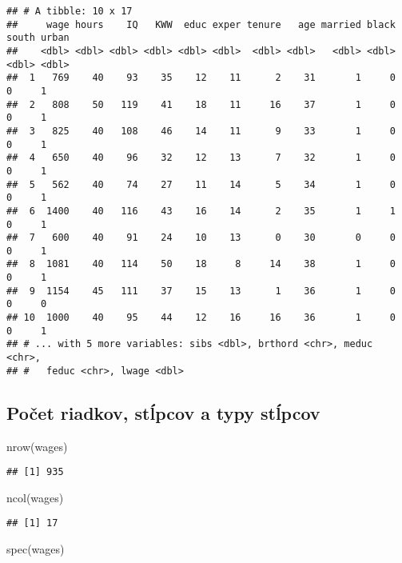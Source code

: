 \documentclass[
]{article}
\newenvironment{Shaded}{\begin{snugshade}}{\end{snugshade}}
\newcommand{\FunctionTok}[1]{\textcolor[rgb]{0.00,0.00,0.00}{#1}}
\newcommand{\NormalTok}[1]{#1}
\begin{document}
\begin{verbatim}
## # A tibble: 10 x 17
##     wage hours    IQ   KWW  educ exper tenure   age married black south urban
##    <dbl> <dbl> <dbl> <dbl> <dbl> <dbl>  <dbl> <dbl>   <dbl> <dbl> <dbl> <dbl>
##  1   769    40    93    35    12    11      2    31       1     0     0     1
##  2   808    50   119    41    18    11     16    37       1     0     0     1
##  3   825    40   108    46    14    11      9    33       1     0     0     1
##  4   650    40    96    32    12    13      7    32       1     0     0     1
##  5   562    40    74    27    11    14      5    34       1     0     0     1
##  6  1400    40   116    43    16    14      2    35       1     1     0     1
##  7   600    40    91    24    10    13      0    30       0     0     0     1
##  8  1081    40   114    50    18     8     14    38       1     0     0     1
##  9  1154    45   111    37    15    13      1    36       1     0     0     0
## 10  1000    40    95    44    12    16     16    36       1     0     0     1
## # ... with 5 more variables: sibs <dbl>, brthord <chr>, meduc <chr>,
## #   feduc <chr>, lwage <dbl>
\end{verbatim}

\hypertarget{poux10det-riadkov-stux13apcov-a-typy-stux13apcov}{%
\subsection{Počet riadkov, stĺpcov a typy
stĺpcov}\label{poux10det-riadkov-stux13apcov-a-typy-stux13apcov}}

\begin{Shaded}
\begin{Highlighting}[]
\FunctionTok{nrow}\NormalTok{(wages)}
\end{Highlighting}
\end{Shaded}

\begin{verbatim}
## [1] 935
\end{verbatim}

\begin{Shaded}
\begin{Highlighting}[]
\FunctionTok{ncol}\NormalTok{(wages)}
\end{Highlighting}
\end{Shaded}

\begin{verbatim}
## [1] 17
\end{verbatim}

\begin{Shaded}
\begin{Highlighting}[]
\FunctionTok{spec}\NormalTok{(wages)}
\end{Highlighting}
\end{Shaded}
\end{document}
